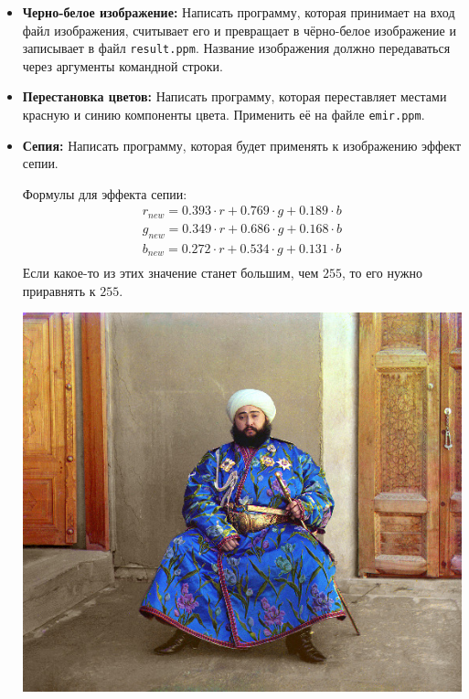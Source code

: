 \documentclass{article}
\begin{document}
\begin{itemize}
\item \textbf{Черно-белое изображение:} Написать программу, которая принимает на вход файл изображения, считывает его и превращает в чёрно-белое изображение и записывает в файл \texttt{result.ppm}. Название изображения должно передаваться через аргументы командной строки. \\
\item \textbf{Перестановка цветов:} Написать программу, которая переставляет местами красную и синию компоненты цвета. Применить её на файле \texttt{emir.ppm}.
\item \textbf{Сепия:} Написать программу, которая будет применять к изображению эффект сепии.
\begin{multicols}{3}
Формулы для эффекта сепии:
\begin{align*}
r_{new} = 0.393 \cdot r + 0.769 \cdot g + 0.189 \cdot b\\
g_{new} = 0.349 \cdot r + 0.686 \cdot g + 0.168 \cdot b\\
b_{new} = 0.272 \cdot r + 0.534 \cdot g + 0.131 \cdot b\\
\end{align*}
Если какое-то из этих значение станет большим, чем $255$, то его нужно приравнять к $255$.
\vfill			
\begin{center}
\includegraphics[scale=0.26]{../images/imageproc.jpg}
\end{center}
\vfill			
\begin{center}

\end{center}
\end{multicols}
\end{itemize}
\end{document}
